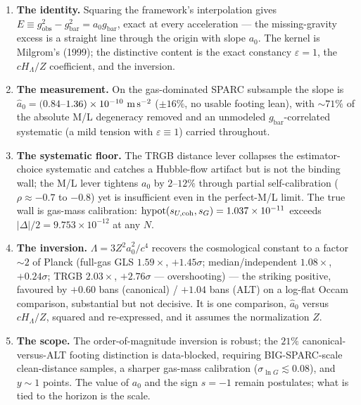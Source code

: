 \documentclass[
]{article}
\begin{document}
\begin{enumerate}
\def\labelenumi{\arabic{enumi}.}
\item
  \textbf{The identity.} Squaring the framework's interpolation gives
  \(E\equiv g_\mathrm{obs}^2-g_\mathrm{bar}^2=a_0 g_\mathrm{bar}\), exact at
  every acceleration --- the missing-gravity excess is a straight line
  through the origin with slope \(a_0\). The kernel is Milgrom's (1999);
  the distinctive content is the exact constancy \(\varepsilon=1\), the
  \(cH_\Lambda/Z\) coefficient, and the inversion.
\item
  \textbf{The measurement.} On the gas-dominated SPARC subsample the
  slope is \(\hat a_0=(0.84\)--\(1.36)\times10^{-10}\ {\rm m\,s^{-2}}\)
  (\(\pm16\%\), no usable footing lean), with \(\sim71\%\) of the
  absolute M/L degeneracy removed and an unmodeled
  \(g_\mathrm{bar}\)-correlated systematic (a mild tension with
  \(\varepsilon\equiv1\)) carried throughout.
\item
  \textbf{The systematic floor.} The TRGB distance lever collapses the
  estimator-choice systematic and catches a Hubble-flow artifact but is
  not the binding wall; the M/L lever tightens \(a_0\) by
  \(2\)--\(12\%\) through partial self-calibration (\(\rho\approx-0.7\)
  to \(-0.8\)) yet is insufficient even in the perfect-M/L limit. The
  true wall is gas-mass calibration:
  \(\mathrm{hypot}(s_{U,\rm coh},s_G)=1.037\times10^{-11}\) exceeds
  \(|\Delta|/2=9.753\times10^{-12}\) at any \(N\).
\item
  \textbf{The inversion.} \(\Lambda=3Z^2\hat a_0^2/c^4\) recovers the
  cosmological constant to a factor \(\sim2\) of Planck (full-gas GLS
  \(1.59\times\), \(+1.45\sigma\); median/independent \(1.08\times\),
  \(+0.24\sigma\); TRGB \(2.03\times\), \(+2.76\sigma\) ---
  overshooting) --- the striking positive, favoured by \(+0.60\) bans
  (canonical) / \(+1.04\) bans (ALT) on a log-flat Occam comparison,
  substantial but not decisive. It is one comparison, \(\hat a_0\)
  versus \(cH_\Lambda/Z\), squared and re-expressed, and it assumes the
  normalization \(Z\).
\item
  \textbf{The scope.} The order-of-magnitude inversion is robust; the
  \(21\%\) canonical-versus-ALT footing distinction is data-blocked,
  requiring BIG-SPARC-scale clean-distance samples, a sharper gas-mass
  calibration (\(\sigma_{\ln G}\lesssim0.08\)), and \(y\sim1\) points.
  The value of \(a_0\) and the sign \(s=-1\) remain postulates; what is
  tied to the horizon is the scale.
\end{enumerate}
\end{document}
